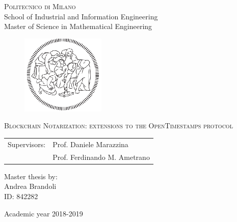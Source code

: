 \begin{titlepage}

	\begin{center}
		\normalsize 
			\textsc{Politecnico di Milano}\\
			School of Industrial and Information Engineering\\
			Master of Science in Mathematical Engineering\\

	\end{center}
	\vspace{.6cm}
	
	\begin{figure}[htpb]
		\centering
		\includegraphics[width=4cm]{Cover/polimi}
	\end{figure}
	\vspace{.6cm}
	
	\begin{center}
		\LARGE
			\textsc{Blockchain Notarization: extensions to the OpenTimestamps protocol \\ }
	\end{center}
	\vspace{1.6cm}

	\begin{flushleft}
		\large
		\begin{tabular}{ll}
		Supervisors:    & Prof. Daniele Marazzina      \\
		             		   & Prof. Ferdinando M. Ametrano
		\end{tabular}
		\vspace{1cm}
	\end{flushleft}
	
	\begin{flushright}
		\large
		Master thesis by:\\
		Andrea Brandoli\\
		ID: 842282\\		
	\end{flushright}
	
	\vspace*{\fill}
	\begin{center}
		Academic year 2018-2019
	\end{center}
	
\end{titlepage}
